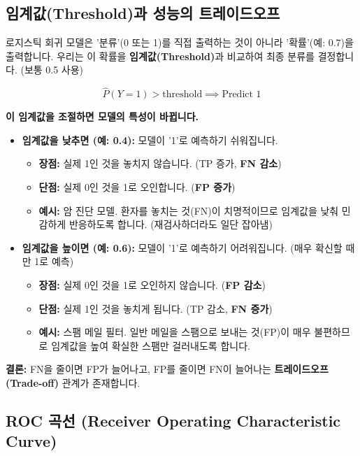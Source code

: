 \documentclass[11pt,a4paper]{book}
\theoremstyle{definition}
\begin{document}
\subsection{임계값(Threshold)과 성능의 트레이드오프}

로지스틱 회귀 모델은 '분류'(0 또는 1)를 직접 출력하는 것이 아니라 '확률'(예: 0.7)을 출력합니다. 우리는 이 확률을 \textbf{임계값(Threshold)}과 비교하여 최종 분류를 결정합니다. (보통 0.5 사용)

$$ \hat{P}(Y=1) > \text{threshold} \implies \text{Predict } 1 $$

\textbf{이 임계값을 조절하면 모델의 특성이 바뀝니다.}

\begin{warningbox}[title=임계값(Threshold) 조절의 효과]
\begin{itemize}
    \item \textbf{임계값을 낮추면 (예: 0.4):}
    모델이 '1'로 예측하기 쉬워집니다.
    \begin{itemize}
        \item \textbf{장점:} 실제 1인 것을 놓치지 않습니다. (TP 증가, \textbf{FN 감소})
        \item \textbf{단점:} 실제 0인 것을 1로 오인합니다. (\textbf{FP 증가})
        \item \textbf{예시:} 암 진단 모델. 환자를 놓치는 것(FN)이 치명적이므로 임계값을 낮춰 민감하게 반응하도록 합니다. (재검사하더라도 일단 잡아냄)
    \end{itemize}
    
    \item \textbf{임계값을 높이면 (예: 0.6):}
    모델이 '1'로 예측하기 어려워집니다. (매우 확신할 때만 1로 예측)
    \begin{itemize}
        \item \textbf{장점:} 실제 0인 것을 1로 오인하지 않습니다. (\textbf{FP 감소})
        \item \textbf{단점:} 실제 1인 것을 놓치게 됩니다. (TP 감소, \textbf{FN 증가})
        \item \textbf{예시:} 스팸 메일 필터. 일반 메일을 스팸으로 보내는 것(FP)이 매우 불편하므로 임계값을 높여 확실한 스팸만 걸러내도록 합니다.
    \end{itemize}
\end{itemize}
\textbf{결론:} FN을 줄이면 FP가 늘어나고, FP를 줄이면 FN이 늘어나는 \textbf{트레이드오프(Trade-off)} 관계가 존재합니다.
\end{warningbox}

\subsection{ROC 곡선 (Receiver Operating Characteristic Curve)}
\end{document}
